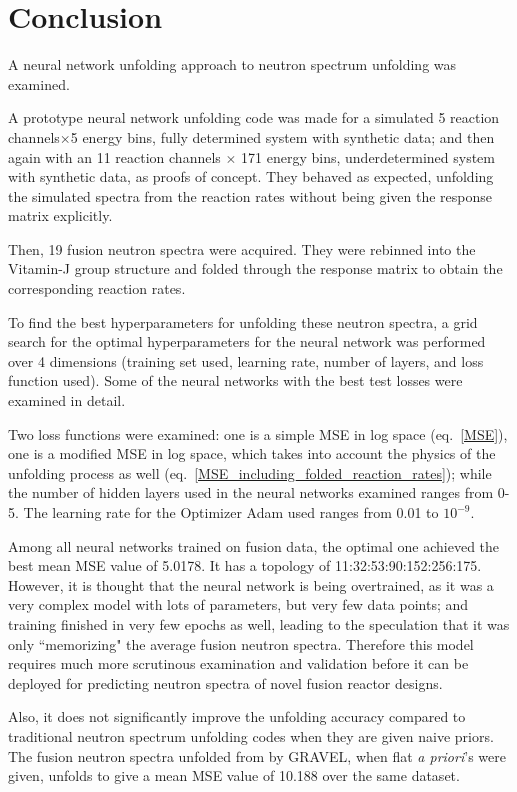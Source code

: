 \documentclass[a4paper, 12pt]{article}
\begin{document}
\section{Conclusion}
    A neural network unfolding approach to neutron spectrum unfolding was examined.

    A prototype neural network unfolding code was made for a simulated 5 reaction channels$\times$5 energy bins, fully determined system with synthetic data; and then again with an 11 reaction channels $\times$ 171 energy bins, underdetermined system with synthetic data, as proofs of concept. They behaved as expected, unfolding the simulated spectra from the reaction rates without being given the response matrix explicitly.

    Then, 19 fusion neutron spectra were acquired. They were rebinned into the Vitamin-J group structure and folded through the response matrix to obtain the corresponding reaction rates. 

    To find the best hyperparameters for unfolding these neutron spectra, a grid search for the optimal hyperparameters for the neural network was performed over 4 dimensions (training set used, learning rate, number of layers, and loss function used). Some of the neural networks with the best test losses were examined in detail.

    Two loss functions were examined: one is a simple MSE in log space (eq.~\ref{MSE}), one is a modified MSE in log space, which takes into account the physics of the unfolding process as well (eq.~\ref{MSE_including_folded_reaction_rates}); while the number of hidden layers used in the neural networks examined ranges from 0-5. The learning rate for the Optimizer Adam used ranges from 0.01 to $10^{-9}$.

    Among all neural networks trained on fusion data, the optimal one achieved the best mean MSE value of 5.0178. It has a topology of 11:32:53:90:152:256:175. However, it is thought that the neural network is being overtrained, as it was a very complex model with lots of parameters, but very few data points; and training finished in very few epochs as well, leading to the speculation that it was only ``memorizing" the average fusion neutron spectra. Therefore this model requires much more scrutinous examination and validation before it can be deployed for predicting neutron spectra of novel fusion reactor designs.

    Also, it does not significantly improve the unfolding accuracy compared to traditional neutron spectrum unfolding codes when they are given naive priors. The fusion neutron spectra unfolded from by GRAVEL, when flat \emph{a priori}'s were given, unfolds to give a mean MSE value of 10.188 over the same dataset.
\end{document}
